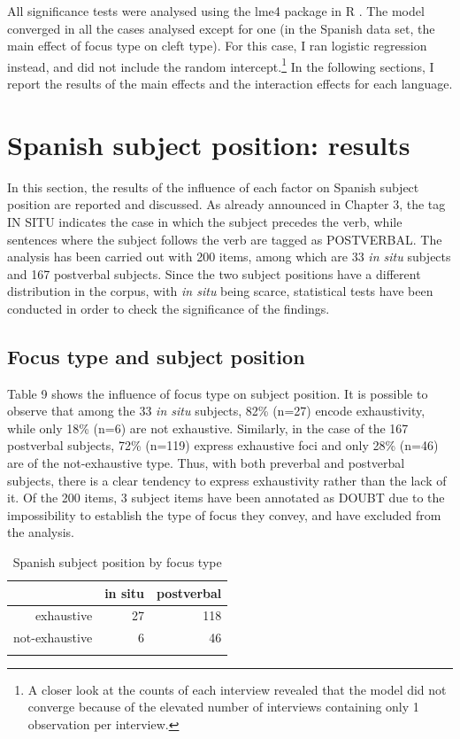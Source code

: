 All significance tests were analysed using the lme4 package \parencite{bates2014fitting} in R \parencite{rcoreteam19}. The model converged in all the cases analysed except for one (in the Spanish data set, the main effect of focus type on cleft type). For this case, I ran logistic regression instead, and did not include the random intercept.\footnote{A closer look at the counts of each interview revealed that the model did not converge because of the elevated number of interviews containing only 1 observation per interview.} In the following sections, I report the results of the main effects and the interaction effects for each language.


\section{Spanish subject position: results}
In this section, the results of the influence of each factor on Spanish subject position are reported and discussed. As already announced in Chapter 3, the tag {\selectfont IN SITU} indicates the case in which the subject precedes the verb, while sentences where the subject follows the verb are tagged as {\selectfont POSTVERBAL}. The analysis has been carried out with 200 items, among which are 33 \textit{in situ} subjects and 167 postverbal subjects. Since the two subject positions have a different distribution in the corpus, with \textit{in situ} being scarce, statistical tests have been conducted in order to check the significance of the findings.

\subsection{Focus type and subject position}
Table 9 shows the influence of focus type on subject position. It is possible to observe that among the 33 \textit{in situ} subjects, 82\% (n=27) encode exhaustivity, while only 18\% (n=6) are not exhaustive. Similarly, in the case of the 167 postverbal subjects, 72\% (n=119) express exhaustive foci and only 28\% (n=46) are of the not-exhaustive type. Thus, with both preverbal and postverbal subjects, there is a clear tendency to express exhaustivity rather than the lack of it. Of the 200 items, 3 subject items have been annotated as {\selectfont DOUBT} due to the impossibility to establish the type of focus they convey, and have excluded from the analysis.

\begin{table}[ht]
\centering
\begin{tabular}{rrr}
  \lsptoprule
 & in situ & postverbal \\ 
  \midrule
exhaustive &  27 & 118 \\ 
  not-exhaustive &   6 &  46 \\ 
   \lspbottomrule
\end{tabular}
     \caption{Spanish subject position by focus type}
\end{table}


